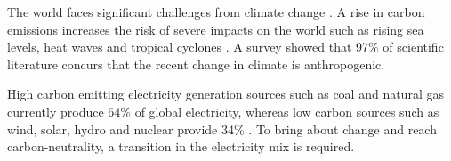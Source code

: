 
The world faces significant challenges from climate change \cite{Masson-Delmotte2018}. A rise in carbon emissions increases the risk of severe impacts on the world such as rising sea levels, heat waves and tropical cyclones \cite{IPCC2014}. A survey \cite{Cook2013} showed that 97\% of scientific literature concurs that the recent change in climate is anthropogenic.

 High carbon emitting electricity generation sources such as coal and natural gas currently produce 64\% of global electricity, whereas low carbon sources such as wind, solar, hydro and nuclear provide 34\% \cite{BP2018,Hall1983}. To bring about change and reach carbon-neutrality, a transition in the electricity mix is required.











